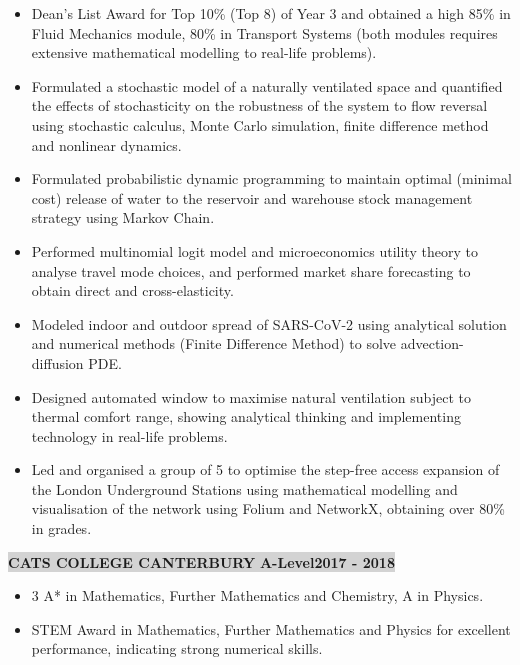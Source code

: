 \documentclass[10pt]{article}
\begin{document}
\begin{itemize}
\setlength\itemsep{0.1em}
    \item Dean's List Award for Top 10\% (Top 8) of Year 3 and obtained a high 85\% in Fluid Mechanics module, 80\% in Transport Systems (both modules requires extensive mathematical modelling to real-life problems).
    \item Formulated a stochastic model of a naturally ventilated space and quantified the effects of stochasticity on the robustness of the system to flow reversal using stochastic calculus, Monte Carlo simulation, finite difference method and nonlinear dynamics.
    \item Formulated probabilistic dynamic programming to maintain optimal (minimal cost) release of water to the reservoir and  warehouse stock management strategy using Markov Chain. 
    \item Performed multinomial logit model and microeconomics utility theory to analyse travel mode choices, and performed market share forecasting to obtain direct and cross-elasticity.
    \item Modeled indoor and outdoor spread of SARS-CoV-2 using analytical solution and numerical methods (Finite Difference Method) to solve advection-diffusion PDE.
    \item Designed automated window to maximise natural ventilation subject to thermal comfort range, showing analytical thinking and implementing technology in real-life problems.
    \item Led and organised a group of 5 to optimise the step-free access expansion of the London Underground Stations using mathematical modelling and visualisation of the network using Folium and NetworkX, obtaining over 80\% in grades.
\end{itemize}

\vspace{-0.6cm}
\begin{center}
{{\colorbox{lightgrey}{\textbf{CATS COLLEGE CANTERBURY }  \qquad  \qquad \quad  \quad \quad \quad \qquad \qquad \qquad \quad \quad \textbf{A-Level}\quad \qquad\quad \quad \qquad \qquad \qquad \qquad \quad \quad \quad \quad \textbf{2017 - 2018}}}}
\end{center}
\vspace{-0.6cm}
\begin{itemize}
\setlength\itemsep{0.1em}
    \item 3 A* in Mathematics, Further Mathematics and Chemistry, A in Physics.
    \item STEM Award in Mathematics, Further Mathematics and Physics for excellent performance, indicating strong numerical skills.
\end{itemize}
\end{document}
